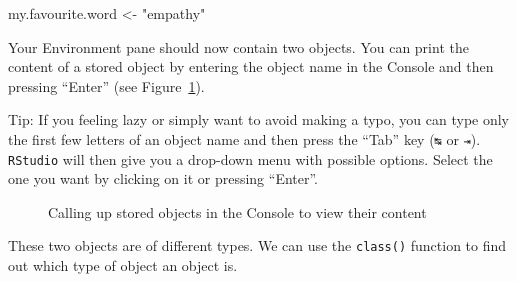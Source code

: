 \documentclass[
  letterpaper,
  DIV=11,
  numbers=noendperiod]{scrreprt}
\newenvironment{Shaded}{\begin{snugshade}}{\end{snugshade}}
\newcommand{\NormalTok}[1]{\textcolor[rgb]{0.00,0.23,0.31}{#1}}
\newcommand{\OtherTok}[1]{\textcolor[rgb]{0.00,0.23,0.31}{#1}}
\newcommand{\StringTok}[1]{\textcolor[rgb]{0.13,0.47,0.30}{#1}}
\begin{document}
\begin{Shaded}
\begin{Highlighting}[]
\NormalTok{my.favourite.word }\OtherTok{\textless{}{-}} \StringTok{"empathy"}
\end{Highlighting}
\end{Shaded}

Your Environment pane should now contain two objects. You can print the
content of a stored object by entering the object name in the Console
and then pressing ``Enter'' (see Figure~\ref{fig-ShowObjects}).

Tip: If you feeling lazy or simply want to avoid making a typo, you can
type only the first few letters of an object name and then press the
``Tab'' key (\texttt{↹} or \texttt{⇥}). \texttt{RStudio} will then give
you a drop-down menu with possible options. Select the one you want by
clicking on it or pressing ``Enter''.

\begin{figure}


\caption{\label{fig-ShowObjects}Calling up stored objects in the Console
to view their content}

\end{figure}%

These two objects are of different types. We can use the
\texttt{class()} function to find out which type of object an object is.
\end{document}
